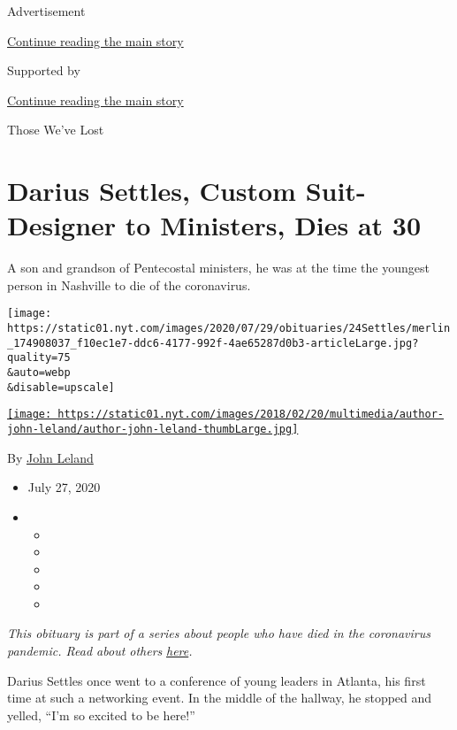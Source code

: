 Advertisement

\protect\hyperlink{after-top}{Continue reading the main story}

Supported by

\protect\hyperlink{after-sponsor}{Continue reading the main story}

Those We've Lost

\hypertarget{darius-settles-custom-suit-designer-to-ministers-dies-at-30}{%
\section{Darius Settles, Custom Suit-Designer to Ministers, Dies at
30}\label{darius-settles-custom-suit-designer-to-ministers-dies-at-30}}

A son and grandson of Pentecostal ministers, he was at the time the
youngest person in Nashville to die of the coronavirus.

\texttt{[image: https://static01.nyt.com/images/2020/07/29/obituaries/24Settles/merlin\_174908037\_f10ec1e7-ddc6-4177-992f-4ae65287d0b3-articleLarge.jpg?quality=75\\\&auto=webp\\\&disable=upscale]}

\href{https://www.nytimes.com/by/john-leland}{\texttt{[image: https://static01.nyt.com/images/2018/02/20/multimedia/author-john-leland/author-john-leland-thumbLarge.jpg]}}

By \href{https://www.nytimes.com/by/john-leland}{John Leland}

\begin{itemize}
\item
  July 27, 2020
\item
  \begin{itemize}
  \item
  \item
  \item
  \item
  \item
  \end{itemize}
\end{itemize}

\emph{This obituary is part of a series about people who have died in
the coronavirus pandemic. Read about others}
\href{https://www.nytimes.com/interactive/2020/obituaries/people-died-coronavirus-obituaries.html}{\emph{here}}\emph{.}

Darius Settles once went to a conference of young leaders in Atlanta,
his first time at such a networking event. In the middle of the hallway,
he stopped and yelled, ``I'm so excited to be here!''

